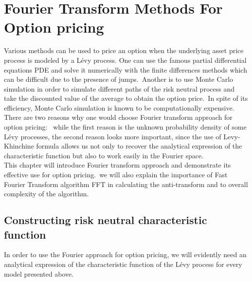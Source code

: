 \documentclass[12pt]{report}
\begin{document}
\chapter{Fourier Transform Methods For Option pricing }

Various methods can be used to price an option when the underlying
asset price process is modeled by a Lévy process. One can use the famous partial differential equations PDE  and solve it numerically with the finite differences methods which  can be difficult due to the presence of jumps.~Another  is to use Monte Carlo simulation in order to simulate different paths of the risk neutral process and take the discounted value of the average  to obtain the option price.~In spite of its efficiency, Monte Carlo simulation is known to be computationally expensive. \\

There are two reasons why one would choose Fourier transform approach for option pricing:~ 
while the first reason is the unknown probability density of some Lévy processes, the second reason looks more important, since the use of Levy-Khinchine formula allows us not only to recover the analytical expression of the characteristic function but also to work easily in the Fourier space. \\

This chapter will introduce Fourier transform approach and demonstrate its effective use for option pricing.~we will also explain the importance of Fast Fourier Transform algorithm FFT in calculating the anti-transform and   to overall complexity of the algorithm. 
\newpage
\section{Constructing risk neutral characteristic  function }

In order to use the Fourier approach for option pricing,  we will  evidently need an analytical expression of the characteristic function of the Lévy process for every model presented above.\\
\end{document}
